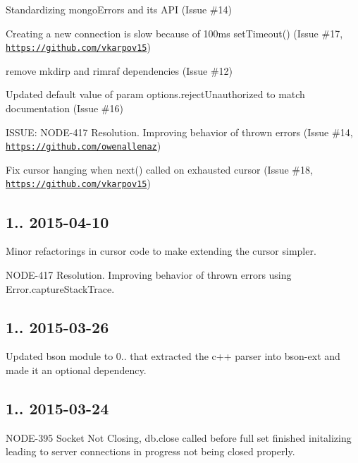 \begin{DoxyItemize}
\item Standardizing mongo\+Errors and its A\+PI (Issue \#14)
\item Creating a new connection is slow because of 100ms set\+Timeout() (Issue \#17, \href{https://github.com/vkarpov15}{\tt https\+://github.\+com/vkarpov15})
\item remove mkdirp and rimraf dependencies (Issue \#12)
\item Updated default value of param options.\+reject\+Unauthorized to match documentation (Issue \#16)
\item I\+S\+S\+UE\+: N\+O\+D\+E-\/417 Resolution. Improving behavior of thrown errors (Issue \#14, \href{https://github.com/owenallenaz}{\tt https\+://github.\+com/owenallenaz})
\item Fix cursor hanging when next() called on exhausted cursor (Issue \#18, \href{https://github.com/vkarpov15}{\tt https\+://github.\+com/vkarpov15})
\end{DoxyItemize}

\subsection*{1.. 2015-\/04-\/10 }


\begin{DoxyItemize}
\item Minor refactorings in cursor code to make extending the cursor simpler.
\item N\+O\+D\+E-\/417 Resolution. Improving behavior of thrown errors using Error.\+capture\+Stack\+Trace.
\end{DoxyItemize}

\subsection*{1.. 2015-\/03-\/26 }


\begin{DoxyItemize}
\item Updated bson module to 0.. that extracted the c++ parser into bson-\/ext and made it an optional dependency.
\end{DoxyItemize}

\subsection*{1.. 2015-\/03-\/24 }


\begin{DoxyItemize}
\item N\+O\+D\+E-\/395 Socket Not Closing, db.\+close called before full set finished initalizing leading to server connections in progress not being closed properly.
\end{DoxyItemize}

